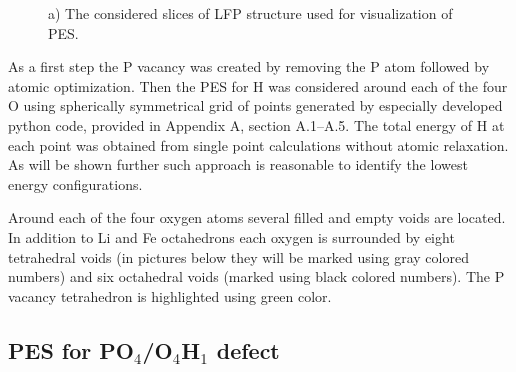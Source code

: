 \begin{figure}[h!]
\begin{minipage}[h]{0.49\linewidth}
\end{minipage}
\caption{a) The considered slices of LFP structure used for visualization of PES.}
\label{ris:planes}
\end{figure}

As a first step the P vacancy was created by removing the P atom followed by atomic optimization. 
Then the PES for H was considered around each of the four O using spherically symmetrical grid of points generated by especially developed python code, provided in Appendix A, section A.1--A.5. The total energy of H at each point was obtained from single point calculations without atomic relaxation. As will be shown further such approach is reasonable to identify the lowest energy configurations. 

Around each of the four oxygen atoms several filled and empty voids are located. In addition to Li and Fe octahedrons each oxygen is surrounded by eight tetrahedral voids (in pictures below they will be marked using gray colored numbers) and six octahedral voids (marked using black colored numbers). The P vacancy tetrahedron is highlighted using green color.

\subsection{PES for PO$_4$/O$_4$H$_1$ defect }


